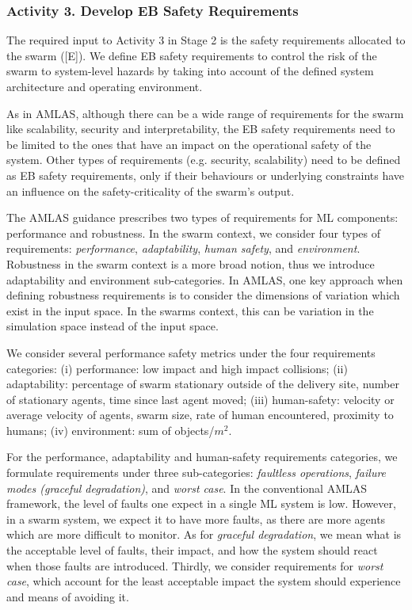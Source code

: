 \documentclass[lettersize,journal]{IEEEtran}
\begin{document}
\subsubsection*{Activity 3. Develop EB Safety Requirements}

The required input to Activity 3 in Stage 2 is the safety requirements allocated to the swarm ([E]).
We define EB safety requirements to control the risk of the swarm to system-level hazards by taking into account of the defined system architecture and operating environment. 

As in AMLAS, although there can be a wide range of requirements for the swarm like scalability, security and interpretability, the EB safety requirements need to be limited to the ones that have an impact on the operational safety of the system. 
Other types of requirements (e.g. security, scalability) need to be defined as EB safety requirements, only if their behaviours or underlying constraints have an influence on the safety-criticality of the swarm's output.  

The AMLAS guidance prescribes two types of requirements for ML components: performance and robustness. 
In the swarm context, we consider four types of requirements: \emph{performance}, \emph{adaptability}, \emph{human safety}, and \emph{environment}.
Robustness in the swarm context is a more broad notion, thus we introduce adaptability and environment sub-categories. 
In AMLAS, one key approach when defining robustness requirements is to consider the dimensions of variation which exist in the input space. In the swarms context, this can be variation in the simulation space instead of the input space. 

We consider several performance safety metrics under the four requirements categories: 
(i) performance: low impact and high impact collisions; 
(ii) adaptability: percentage of swarm stationary outside of the delivery site, number of stationary agents, time since last agent moved; 
(iii) human-safety: velocity or average velocity of agents, swarm size, rate of human encountered, proximity to humans;
(iv) environment: sum of objects/$m^2$.

For the performance, adaptability and human-safety requirements categories, we formulate requirements under three sub-categories: \emph{faultless operations}, \emph{failure modes (graceful degradation)}, and \emph{worst case}. 
In the conventional AMLAS framework, the level of faults one expect in a single ML system is low. 
However, in a swarm system, we expect it to have more faults, as there are more agents which are more difficult to monitor. 
As for \emph{graceful degradation}, we mean what is the acceptable level of faults, their impact, and how the system should react when those faults are introduced. 
Thirdly, we consider requirements for \emph{worst case}, which account for the least acceptable impact the system should experience and means of avoiding it. 
\end{document}
